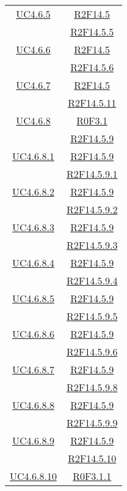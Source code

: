 \begin{longtable}{|c|c|}
\hline
\hyperlink{UC4.6.5}{UC4.6.5} & \hyperlink{R2F14.5}{R2F14.5}\\
& \hyperlink{R2F14.5.5}{R2F14.5.5}\\
\hline
\hyperlink{UC4.6.6}{UC4.6.6} & \hyperlink{R2F14.5}{R2F14.5}\\
& \hyperlink{R2F14.5.6}{R2F14.5.6}\\
\hline
\hyperlink{UC4.6.7}{UC4.6.7} & \hyperlink{R2F14.5}{R2F14.5}\\
& \hyperlink{R2F14.5.11}{R2F14.5.11}\\
\hline
\hyperlink{UC4.6.8}{UC4.6.8} & \hyperlink{R0F3.1}{R0F3.1}\\
& \hyperlink{R2F14.5.9}{R2F14.5.9}\\
\hline
\hyperlink{UC4.6.8.1}{UC4.6.8.1} & \hyperlink{R2F14.5.9}{R2F14.5.9}\\
& \hyperlink{R2F14.5.9.1}{R2F14.5.9.1}\\
\hline
\hyperlink{UC4.6.8.2}{UC4.6.8.2} & \hyperlink{R2F14.5.9}{R2F14.5.9}\\
& \hyperlink{R2F14.5.9.2}{R2F14.5.9.2}\\
\hline
\hyperlink{UC4.6.8.3}{UC4.6.8.3} & \hyperlink{R2F14.5.9}{R2F14.5.9}\\
& \hyperlink{R2F14.5.9.3}{R2F14.5.9.3}\\
\hline
\hyperlink{UC4.6.8.4}{UC4.6.8.4} & \hyperlink{R2F14.5.9}{R2F14.5.9}\\
& \hyperlink{R2F14.5.9.4}{R2F14.5.9.4}\\
\hline
\hyperlink{UC4.6.8.5}{UC4.6.8.5} & \hyperlink{R2F14.5.9}{R2F14.5.9}\\
& \hyperlink{R2F14.5.9.5}{R2F14.5.9.5}\\
\hline
\hyperlink{UC4.6.8.6}{UC4.6.8.6} & \hyperlink{R2F14.5.9}{R2F14.5.9}\\
& \hyperlink{R2F14.5.9.6}{R2F14.5.9.6}\\
\hline
\hyperlink{UC4.6.8.7}{UC4.6.8.7} & \hyperlink{R2F14.5.9}{R2F14.5.9}\\
& \hyperlink{R2F14.5.9.8}{R2F14.5.9.8}\\
\hline
\hyperlink{UC4.6.8.8}{UC4.6.8.8} & \hyperlink{R2F14.5.9}{R2F14.5.9}\\
& \hyperlink{R2F14.5.9.9}{R2F14.5.9.9}\\
\hline
\hyperlink{UC4.6.8.9}{UC4.6.8.9} & \hyperlink{R2F14.5.9}{R2F14.5.9}\\
& \hyperlink{R2F14.5.10}{R2F14.5.10}\\
\hline
\hyperlink{UC4.6.8.10}{UC4.6.8.10} & \hyperlink{R0F3.1.1}{R0F3.1.1}\\

\end{longtable}
